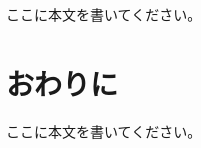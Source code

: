 \documentclass[no-page-number]{nanzan-abstract}
\begin{document}
ここに本文を書いてください。


\section{おわりに}

%
%
%
%

ここに本文を書いてください。




\end{document}
